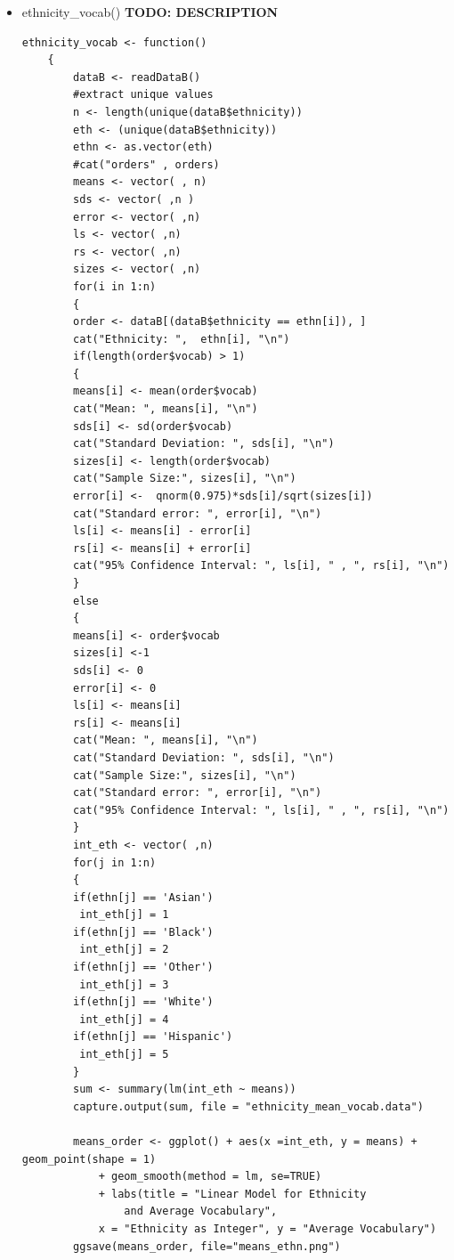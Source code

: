\documentclass[11pt]{article}  %
\begin{document}
\begin{itemize}
    \label{sec:EV}
    \item ethnicity\_vocab() \textbf{TODO: DESCRIPTION}
    \begin{lstlisting}[basicstyle=\small]
    ethnicity_vocab <- function()
    {
        dataB <- readDataB()
        #extract unique values
        n <- length(unique(dataB$ethnicity))
        eth <- (unique(dataB$ethnicity))
        ethn <- as.vector(eth)
        #cat("orders" , orders)
        means <- vector( , n)
        sds <- vector( ,n )
        error <- vector( ,n)
        ls <- vector( ,n)
        rs <- vector( ,n)
        sizes <- vector( ,n)
        for(i in 1:n)
        {
        order <- dataB[(dataB$ethnicity == ethn[i]), ]
        cat("Ethnicity: ",  ethn[i], "\n")
        if(length(order$vocab) > 1)
        {
        means[i] <- mean(order$vocab)
        cat("Mean: ", means[i], "\n")
        sds[i] <- sd(order$vocab)
        cat("Standard Deviation: ", sds[i], "\n")
        sizes[i] <- length(order$vocab)
        cat("Sample Size:", sizes[i], "\n")
        error[i] <-  qnorm(0.975)*sds[i]/sqrt(sizes[i])
        cat("Standard error: ", error[i], "\n")
        ls[i] <- means[i] - error[i]
        rs[i] <- means[i] + error[i]
        cat("95% Confidence Interval: ", ls[i], " , ", rs[i], "\n")
        }
        else
        {
        means[i] <- order$vocab
        sizes[i] <-1
        sds[i] <- 0
        error[i] <- 0
        ls[i] <- means[i]
        rs[i] <- means[i]
        cat("Mean: ", means[i], "\n")
        cat("Standard Deviation: ", sds[i], "\n")
        cat("Sample Size:", sizes[i], "\n")
        cat("Standard error: ", error[i], "\n")
        cat("95% Confidence Interval: ", ls[i], " , ", rs[i], "\n")
        }
        int_eth <- vector( ,n)
        for(j in 1:n)
        {
        if(ethn[j] == 'Asian')
         int_eth[j] = 1
        if(ethn[j] == 'Black')
         int_eth[j] = 2
        if(ethn[j] == 'Other')
         int_eth[j] = 3
        if(ethn[j] == 'White')
         int_eth[j] = 4
        if(ethn[j] == 'Hispanic')
         int_eth[j] = 5
        }
        sum <- summary(lm(int_eth ~ means))
        capture.output(sum, file = "ethnicity_mean_vocab.data")
        
        means_order <- ggplot() + aes(x =int_eth, y = means) + geom_point(shape = 1)
            + geom_smooth(method = lm, se=TRUE)
            + labs(title = "Linear Model for Ethnicity
                and Average Vocabulary",
            x = "Ethnicity as Integer", y = "Average Vocabulary")
        ggsave(means_order, file="means_ethn.png")
        

\end{lstlisting}
\end{itemize}
\end{document}
